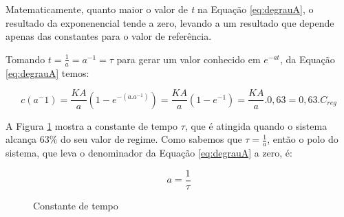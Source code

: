 






Matematicamente, quanto maior o valor de \emph{t} na Equação \ref{eq:degrauA}, o resultado da exponenencial tende a zero, levando a um resultado que depende apenas das constantes para o valor de referência. 

Tomando $t= \frac{1}{a} = a^{-1} = \tau$ para gerar um valor conhecido em $e^{-at}$, da Equação \ref{eq:degrauA} temos:


\begin{equation}
c(a^-1) = \frac{KA}{a}(1-e^{-(a.a^{-1})}) = \frac{KA}{a}(1-e^{-1}) = \frac{KA}{a}.0,63 = 0,63 . C_{reg}
\end{equation}

A Figura \ref{fig:constTempo} mostra a constante de tempo $\tau$, que é atingida quando o sistema alcança 63\% do seu valor de regime. Como sabemos que $\tau = \frac{1}{a}$, então o polo do sistema, que leva o denominador da Equação \ref{eq:degrauA} a zero, é:

\begin{equation}
a = \frac{1}{\tau}
\end{equation}



\begin{figure}
\centering
{}
\caption{Constante de tempo}
\label{fig:constTempo}
\end{figure}

